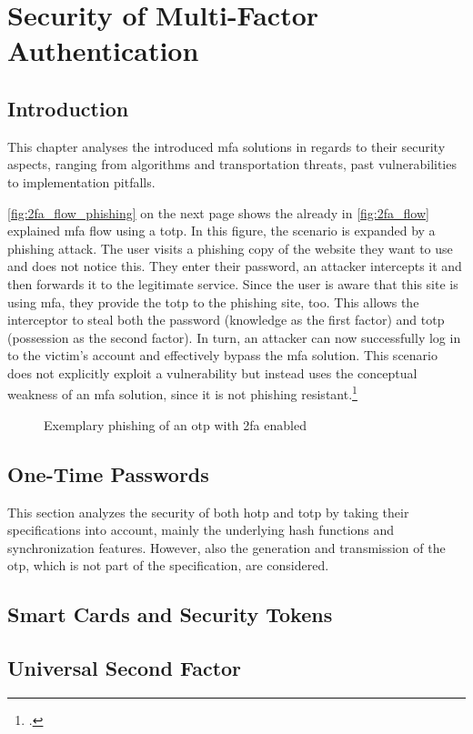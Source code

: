 \chapter{Security of Multi-Factor Authentication}

\section{Introduction}

This chapter analyses the introduced \gls{mfa} solutions in regards to their security aspects, ranging from algorithms and transportation threats, past vulnerabilities to implementation pitfalls.

\autoref{fig:2fa_flow_phishing} on the next page shows the already in \autoref{fig:2fa_flow} explained \gls{mfa} flow using a \gls{totp}. In this figure, the scenario is expanded by a phishing attack. The user visits a phishing copy of the website they want to use and does not notice this. They enter their password, an attacker intercepts it and then forwards it to the legitimate service. Since the user is aware that this site is using \gls{mfa}, they provide the \gls{totp} to the phishing site, too. This allows the interceptor to steal both the password (knowledge as the first factor) and \gls{totp} (possession as the second factor). In turn, an attacker can now successfully log in to the victim's account and effectively bypass the \gls{mfa} solution. This scenario does not explicitly exploit a vulnerability but instead uses the conceptual weakness of an \gls{mfa} solution, since it is not phishing resistant.\footcites[See][61]{Ulqinaku:2019:FPP:3317549.3323404}

\newpage

\begin{figure}[hbt]
	\centering
	
	\caption[Exemplary phishing of an \gls{otp} with \gls{2fa} enabled]{Exemplary phishing of an \gls{otp} with \gls{2fa} enabled\footnotemark}
	\label{fig:2fa_flow_phishing}
\end{figure}

\section{One-Time Passwords}
\label{sec:totp_sec}

This section analyzes the security of both \gls{hotp} and \gls{totp} by taking their specifications into account, mainly the underlying hash functions and synchronization features. However, also the generation and transmission of the \gls{otp}, which is not part of the specification, are considered.



\section{Smart Cards and Security Tokens}
\label{sec:tokens}



\section{Universal Second Factor}
\label{sec:u2f}


